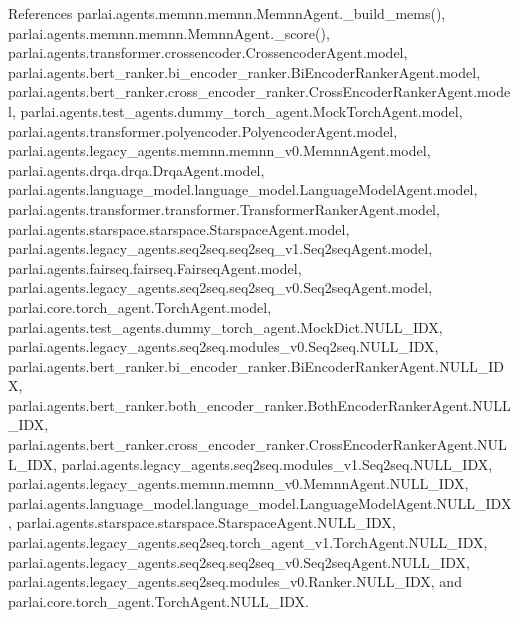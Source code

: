 References parlai.\+agents.\+memnn.\+memnn.\+Memnn\+Agent.\+\_\+build\+\_\+mems(), parlai.\+agents.\+memnn.\+memnn.\+Memnn\+Agent.\+\_\+score(), parlai.\+agents.\+transformer.\+crossencoder.\+Crossencoder\+Agent.\+model, parlai.\+agents.\+bert\+\_\+ranker.\+bi\+\_\+encoder\+\_\+ranker.\+Bi\+Encoder\+Ranker\+Agent.\+model, parlai.\+agents.\+bert\+\_\+ranker.\+cross\+\_\+encoder\+\_\+ranker.\+Cross\+Encoder\+Ranker\+Agent.\+model, parlai.\+agents.\+test\+\_\+agents.\+dummy\+\_\+torch\+\_\+agent.\+Mock\+Torch\+Agent.\+model, parlai.\+agents.\+transformer.\+polyencoder.\+Polyencoder\+Agent.\+model, parlai.\+agents.\+legacy\+\_\+agents.\+memnn.\+memnn\+\_\+v0.\+Memnn\+Agent.\+model, parlai.\+agents.\+drqa.\+drqa.\+Drqa\+Agent.\+model, parlai.\+agents.\+language\+\_\+model.\+language\+\_\+model.\+Language\+Model\+Agent.\+model, parlai.\+agents.\+transformer.\+transformer.\+Transformer\+Ranker\+Agent.\+model, parlai.\+agents.\+starspace.\+starspace.\+Starspace\+Agent.\+model, parlai.\+agents.\+legacy\+\_\+agents.\+seq2seq.\+seq2seq\+\_\+v1.\+Seq2seq\+Agent.\+model, parlai.\+agents.\+fairseq.\+fairseq.\+Fairseq\+Agent.\+model, parlai.\+agents.\+legacy\+\_\+agents.\+seq2seq.\+seq2seq\+\_\+v0.\+Seq2seq\+Agent.\+model, parlai.\+core.\+torch\+\_\+agent.\+Torch\+Agent.\+model, parlai.\+agents.\+test\+\_\+agents.\+dummy\+\_\+torch\+\_\+agent.\+Mock\+Dict.\+N\+U\+L\+L\+\_\+\+I\+DX, parlai.\+agents.\+legacy\+\_\+agents.\+seq2seq.\+modules\+\_\+v0.\+Seq2seq.\+N\+U\+L\+L\+\_\+\+I\+DX, parlai.\+agents.\+bert\+\_\+ranker.\+bi\+\_\+encoder\+\_\+ranker.\+Bi\+Encoder\+Ranker\+Agent.\+N\+U\+L\+L\+\_\+\+I\+DX, parlai.\+agents.\+bert\+\_\+ranker.\+both\+\_\+encoder\+\_\+ranker.\+Both\+Encoder\+Ranker\+Agent.\+N\+U\+L\+L\+\_\+\+I\+DX, parlai.\+agents.\+bert\+\_\+ranker.\+cross\+\_\+encoder\+\_\+ranker.\+Cross\+Encoder\+Ranker\+Agent.\+N\+U\+L\+L\+\_\+\+I\+DX, parlai.\+agents.\+legacy\+\_\+agents.\+seq2seq.\+modules\+\_\+v1.\+Seq2seq.\+N\+U\+L\+L\+\_\+\+I\+DX, parlai.\+agents.\+legacy\+\_\+agents.\+memnn.\+memnn\+\_\+v0.\+Memnn\+Agent.\+N\+U\+L\+L\+\_\+\+I\+DX, parlai.\+agents.\+language\+\_\+model.\+language\+\_\+model.\+Language\+Model\+Agent.\+N\+U\+L\+L\+\_\+\+I\+DX, parlai.\+agents.\+starspace.\+starspace.\+Starspace\+Agent.\+N\+U\+L\+L\+\_\+\+I\+DX, parlai.\+agents.\+legacy\+\_\+agents.\+seq2seq.\+torch\+\_\+agent\+\_\+v1.\+Torch\+Agent.\+N\+U\+L\+L\+\_\+\+I\+DX, parlai.\+agents.\+legacy\+\_\+agents.\+seq2seq.\+seq2seq\+\_\+v0.\+Seq2seq\+Agent.\+N\+U\+L\+L\+\_\+\+I\+DX, parlai.\+agents.\+legacy\+\_\+agents.\+seq2seq.\+modules\+\_\+v0.\+Ranker.\+N\+U\+L\+L\+\_\+\+I\+DX, and parlai.\+core.\+torch\+\_\+agent.\+Torch\+Agent.\+N\+U\+L\+L\+\_\+\+I\+DX.



